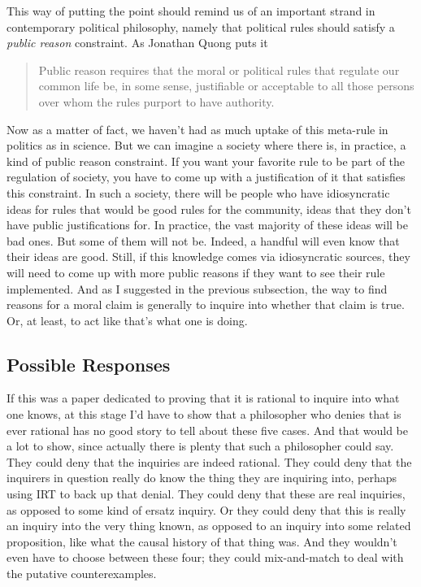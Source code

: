 \documentclass[
  11pt,
]{book}
\begin{document}
This way of putting the point should remind us of an important strand in contemporary political philosophy, namely that political rules should satisfy a \emph{public reason} constraint. As Jonathan Quong puts it

\begin{quote}
Public reason requires that the moral or political rules that regulate our common life be, in some sense, justifiable or acceptable to all those persons over whom the rules purport to have authority. \citep{Quong2017}
\end{quote}

Now as a matter of fact, we haven't had as much uptake of this meta-rule in politics as in science. But we can imagine a society where there is, in practice, a kind of public reason constraint. If you want your favorite rule to be part of the regulation of society, you have to come up with a justification of it that satisfies this constraint. In such a society, there will be people who have idiosyncratic ideas for rules that would be good rules for the community, ideas that they don't have public justifications for. In practice, the vast majority of these ideas will be bad ones. But some of them will not be. Indeed, a handful will even know that their ideas are good. Still, if this knowledge comes via idiosyncratic sources, they will need to come up with more public reasons if they want to see their rule implemented. And as I suggested in the previous subsection, the way to find reasons for a moral claim is generally to inquire into whether that claim is true. Or, at least, to act like that's what one is doing.

\hypertarget{friedmaninquiry}{%
\subsection{Possible Responses}\label{friedmaninquiry}}

If this was a paper dedicated to proving that it is rational to inquire into what one knows, at this stage I'd have to show that a philosopher who denies that is ever rational has no good story to tell about these five cases. And that would be a lot to show, since actually there is plenty that such a philosopher could say. They could deny that the inquiries are indeed rational. They could deny that the inquirers in question really do know the thing they are inquiring into, perhaps using IRT to back up that denial. They could deny that these are real inquiries, as opposed to some kind of ersatz inquiry. Or they could deny that this is really an inquiry into the very thing known, as opposed to an inquiry into some related proposition, like what the causal history of that thing was. And they wouldn't even have to choose between these four; they could mix-and-match to deal with the putative counterexamples.
\end{document}
